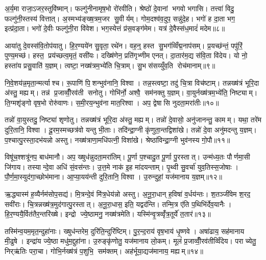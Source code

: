 अ॒र्य॒मा राजा॒ऽजर॒स्तुवि॑ष्मान्। फल्गु॑नीनामृष॒भो रो॑रवीति। श्रेष्ठो॑ दे॒वानां भगवो भगासि। तत्त्वा॑ विदु॒ फल्गु॑नी॒स्तस्य॑ वित्तात्। अ॒स्मभ्य॑ङ्ख्ष॒त्रम॒जर सु॒वीर्यम्। गोम॒दश्व॑व॒दुप॒ सन्नु॑दे॒ह। भगो॑ ह दा॒ता भग॒ इत्प्र॑दा॒ता। भगो॑ दे॒वीः फल्गु॑नी॒रा वि॑वेश। भग॒स्येत्तं प्र॑स॒वङ्ग॑मेम। यत्र॑ दे॒वैस्स॑ध॒मादं॑ मदेम॥८॥

आया॑तु दे॒वस्स॑वि॒तोप॑यातु। हि॒र॒ण्यये॑न सु॒वृता॒ रथे॑न। वह॒न्॒ हस्त सु॒भग॑व्विँद्म॒नाप॑सम्। प्र॒यच्छ॑न्तं॒ पपु॑रिं॒ पुण्य॒मच्छ॑। हस्त॒ प्रय॑च्छत्व॒मृतं॒ वसी॑यः। दख्षि॑णेन॒ प्रति॑गृभ्णीम एनत्। दा॒तार॑म॒द्य स॑वि॒ता वि॑देय। यो नो॒ हस्ता॑य प्रसु॒वाति॑ य॒ज्ञम्। त्वष्टा॒ नख्ष॑त्रम॒भ्ये॑ति चि॒त्राम्। सु॒भस॑सय्युँव॒ति रोच॑मानाम्॥९॥

नि॒वे॒शय॑न्न॒मृता॒न्मर्त्याश्च। रू॒पाणि॑ पि॒शन्भुव॑नानि॒ विश्वा। तन्न॒स्त्वष्टा॒ तदु॑ चि॒त्रा विच॑ष्टाम्। तन्नख्ष॑त्रं भूरि॒दा अ॑स्तु॒ मह्यम्। तन्न॑ प्र॒जाव्वीँ॒रव॑ती सनोतु। गोभि॑र्नो॒ अश्वै॒ सम॑नक्तु य॒ज्ञम्। वा॒युर्नख्ष॑त्रम॒भ्ये॑ति॒ निष्ट्याम्। ति॒ग्मशृ॑ङ्गो वृष॒भो रोरु॑वाणः। स॒मी॒रय॒न्भुव॑ना मात॒रिश्वा। अप॒ द्वेषासि नुदता॒मरा॑तीः॥१०॥

तन्नो॑ वा॒युस्तदु॒ निष्ट्या॑ शृणोतु। तन्नख्ष॑त्रं भूरि॒दा अ॑स्तु॒ मह्यम्। तन्नो॑ दे॒वासो॒ अनु॑जानन्तु॒ कामम्। यथा॒ तरे॑म दुरि॒तानि॒ विश्वा। दू॒रम॒स्मच्छत्र॑वो यन्तु भी॒ताः। तदि॑न्द्रा॒ग्नी कृ॑णुता॒न्तद्विशा॑खे। तन्नो॑ दे॒वा अनु॑मदन्तु य॒ज्ञम्। प॒श्चात्पु॒रस्ता॒दभ॑यन्नो अस्तु। नख्ष॑त्राणा॒मधि॑पत्नी॒ विशा॑खे। श्रेष्ठा॑विन्द्रा॒ग्नी भुव॑नस्य गो॒पौ॥११॥

विषू॑च॒श्शत्रू॑नप॒ बाध॑मानौ। अप॒ ख्षुध॑न्नुदता॒मरा॑तिम्। पू॒र्णा प॒श्चादु॒त पू॒र्णा पु॒रस्तात्। उन्म॑ध्य॒तः पौर्णमा॒सी जि॑गाय। तस्यान्दे॒वा अधि॑ सं॒वस॑न्तः। उ॒त्त॒मे नाक॑ इ॒ह मा॑दयन्ताम्। पृ॒थ्वी सु॒वर्चा॑ युव॒तिस्स॒जोषाः। पौ॒र्ण॒मा॒स्युद॑गा॒च्छोभ॑माना। आ॒प्या॒यय॑न्ती दुरि॒तानि॒ विश्वा। उ॒रुन्दुहां॒ यज॑मानाय य॒ज्ञम्॥१२॥\anuvakamend[चि॒त्रभा॑नु॒र्यज॑माने दधातु ह॒विर्न॒ पाथ॒श्चेतो॑ जुषन्ता॒ञ्चेतो॑ मदेम॒ रोच॑माना॒मरा॑तीर्गो॒पौ य॒ज्ञम्]

ऋ॒द्ध्यास्म॑ ह॒व्यैर्नम॑सोप॒सद्य॑। मि॒त्रन्दे॒वं मि॑त्र॒धेय॑न्नो अस्तु। अ॒नू॒रा॒धान् ह॒विषा॑ व॒र्धय॑न्तः। श॒तञ्जी॑वेम श॒रद॒ सवी॑राः। चि॒त्रन्नख्ष॑त्र॒मुद॑गात्पु॒रस्तात्। अ॒नू॒रा॒धास॒ इति॒ यद्वद॑न्ति। तन्मि॒त्र ए॑ति प॒थिभि॑र्देव॒यानैः। हि॒र॒ण्ययै॒र्वित॑तैर॒न्तरि॑ख्षे। इन्द्रो ज्ये॒ष्ठामनु॒ नख्ष॑त्रमेति। यस्मि॑न्वृ॒त्रव्वृँ॑त्र॒तूर्ये॑ त॒तार॑॥१३॥

तस्मि॑न्व॒यम॒मृत॒न्दुहा॑नाः। ख्षुध॑न्तरेम॒ दुरि॑ति॒न्दुरि॑ष्टिम्। पु॒र॒न्द॒राय॑ वृष॒भाय॑ धृ॒ष्णवे। अषा॑ढाय॒ सह॑मानाय मी॒ढुषे। इन्द्रा॑य ज्ये॒ष्ठा मधु॑म॒द्दुहा॑ना। उ॒रुङ्कृ॑णोतु॒ यज॑मानाय लो॒कम्। मूलं॑ प्र॒जाव्वीँ॒रव॑तीव्विँदेय। पराच्येतु॒ निर्‌ऋ॑तिः परा॒चा। गोभि॒र्नख्ष॑त्रं प॒शुभि॒ सम॑क्तम्। अह॑र्भूया॒द्यज॑मानाय॒ मह्यम्॥१४॥

